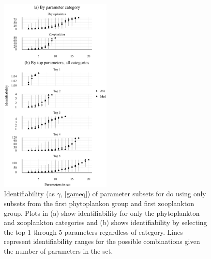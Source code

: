 \documentclass[letterpaper,12pt,oneside]{article}\usepackage[]{graphicx}\usepackage[]{color}
\begin{document}
\begin{figure}[!ht]

{\centering \includegraphics[width=0.5\textwidth]{figs/p1z1identbox-1} 

}

\caption[Identifiability (as ]{Identifiability (as $\gamma$, \cref{gameq}) of parameter subsets for \ac{do} using only subsets from the first phytoplankon group and first zooplankton group. Plots in (a) show identifiability for only the phytoplankton and zooplankton categories and (b) shows identifiability by selecting the top 1 through 5 parameters regardless of category. Lines represent identifiability ranges for the possible combinations given the number of parameters in the set.}\label{fig:p1z1identbox}
\end{figure}
\end{document}
